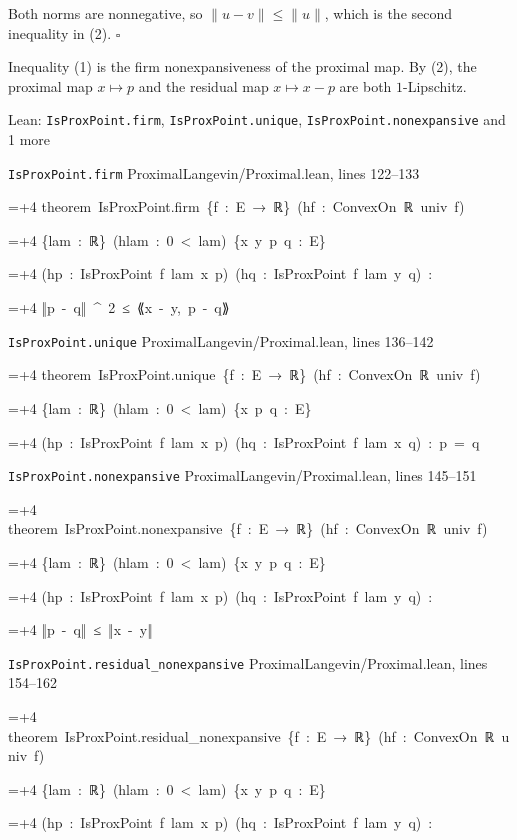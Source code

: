 \documentclass[11pt,a4paper]{report}
\newlength{\leancharwidth}
\newenvironment{leancode}{\par\smallskip\begingroup\ttfamily\footnotesize\raggedright
  \settowidth{\leancharwidth}{M}\setlength{\parskip}{0pt}\setlength{\parindent}{0pt}
  \frenchspacing}{\par\endgroup\smallskip}
\newcommand{\leanline}[2]{\hangindent=\dimexpr#1\leancharwidth+4\leancharwidth\relax
  \hangafter=1\noindent\hspace*{#1\leancharwidth}#2\par}
\newcommand{\leansource}[1]{\par{\footnotesize\color{leanmuted}#1}\par}
\begin{document}
Both norms are nonnegative, so \(\|u-v\|\le\|u\|\), which is the second inequality in (2). \(\square\)




Inequality (1) is the firm nonexpansiveness of the proximal map. By (2), the proximal map \(x\mapsto p\) and the residual map \(x\mapsto x-p\) are both \(1\)-Lipschitz.

\begin{leanbox}{Lean: \texttt{IsProxPoint.\allowbreak{}firm}, \texttt{IsProxPoint.\allowbreak{}unique}, \texttt{IsProxPoint.\allowbreak{}nonexpansive} and 1 more}
\leansource{\texttt{IsProxPoint.\allowbreak{}firm} \quad ProximalLangevin/\allowbreak{}Proximal.lean, lines 122–133}
\begin{leancode}
\leanline{0}{theorem\ IsProxPoint.firm\ \{f\ :\ E\ →\ ℝ\}\ (hf\ :\ ConvexOn\ ℝ\ univ\ f)}
\leanline{4}{\{lam\ :\ ℝ\}\ (hlam\ :\ 0\ <\ lam)\ \{x\ y\ p\ q\ :\ E\}}
\leanline{4}{(hp\ :\ IsProxPoint\ f\ lam\ x\ p)\ (hq\ :\ IsProxPoint\ f\ lam\ y\ q)\ :}
\leanline{4}{‖p\ -\ q‖\ \textasciicircum{}\ 2\ ≤\ {\leanfallback ⟪}x\ -\ y,\ p\ -\ q{\leanfallback ⟫}}
\end{leancode}
\leansource{\texttt{IsProxPoint.\allowbreak{}unique} \quad ProximalLangevin/\allowbreak{}Proximal.lean, lines 136–142}
\begin{leancode}
\leanline{0}{theorem\ IsProxPoint.unique\ \{f\ :\ E\ →\ ℝ\}\ (hf\ :\ ConvexOn\ ℝ\ univ\ f)}
\leanline{4}{\{lam\ :\ ℝ\}\ (hlam\ :\ 0\ <\ lam)\ \{x\ p\ q\ :\ E\}}
\leanline{4}{(hp\ :\ IsProxPoint\ f\ lam\ x\ p)\ (hq\ :\ IsProxPoint\ f\ lam\ x\ q)\ :\ p\ =\ q}
\end{leancode}
\leansource{\texttt{IsProxPoint.\allowbreak{}nonexpansive} \quad ProximalLangevin/\allowbreak{}Proximal.lean, lines 145–151}
\begin{leancode}
\leanline{0}{theorem\ IsProxPoint.nonexpansive\ \{f\ :\ E\ →\ ℝ\}\ (hf\ :\ ConvexOn\ ℝ\ univ\ f)}
\leanline{4}{\{lam\ :\ ℝ\}\ (hlam\ :\ 0\ <\ lam)\ \{x\ y\ p\ q\ :\ E\}}
\leanline{4}{(hp\ :\ IsProxPoint\ f\ lam\ x\ p)\ (hq\ :\ IsProxPoint\ f\ lam\ y\ q)\ :}
\leanline{4}{‖p\ -\ q‖\ ≤\ ‖x\ -\ y‖}
\end{leancode}
\leansource{\texttt{IsProxPoint.\allowbreak{}residual\_\allowbreak{}nonexpansive} \quad ProximalLangevin/\allowbreak{}Proximal.lean, lines 154–162}
\begin{leancode}
\leanline{0}{theorem\ IsProxPoint.residual\_nonexpansive\ \{f\ :\ E\ →\ ℝ\}\ (hf\ :\ ConvexOn\ ℝ\ univ\ f)}
\leanline{4}{\{lam\ :\ ℝ\}\ (hlam\ :\ 0\ <\ lam)\ \{x\ y\ p\ q\ :\ E\}}
\leanline{4}{(hp\ :\ IsProxPoint\ f\ lam\ x\ p)\ (hq\ :\ IsProxPoint\ f\ lam\ y\ q)\ :}

\end{leancode}
\end{leanbox}
\end{document}

